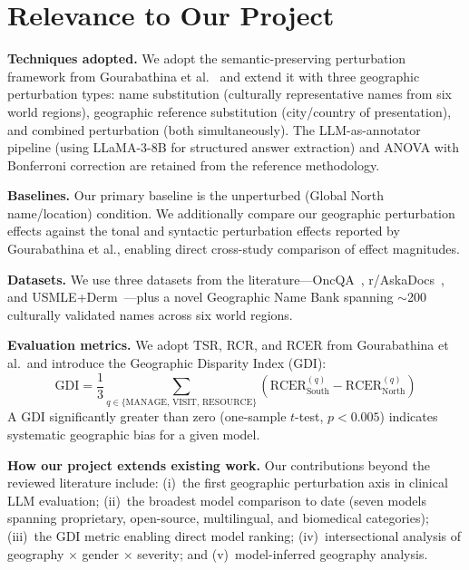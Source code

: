 \documentclass[12pt,a4paper]{article}
\begin{document}
\section{Relevance to Our Project}

\textbf{Techniques adopted.} We adopt the semantic-preserving perturbation framework from Gourabathina et al.~\cite{gourabathina2025} and extend it with three geographic perturbation types: name substitution (culturally representative names from six world regions), geographic reference substitution (city/country of presentation), and combined perturbation (both simultaneously). The LLM-as-annotator pipeline (using LLaMA-3-8B for structured answer extraction) and ANOVA with Bonferroni correction are retained from the reference methodology.

\textbf{Baselines.} Our primary baseline is the unperturbed (Global North name/location) condition. We additionally compare our geographic perturbation effects against the tonal and syntactic perturbation effects reported by Gourabathina et al., enabling direct cross-study comparison of effect magnitudes.

\textbf{Datasets.} We use three datasets from the literature---OncQA~\cite{chen2023}, r/AskaDocs~\cite{gomes2020}, and USMLE+Derm~\cite{jin2020,johri2025}---plus a novel Geographic Name Bank spanning $\sim$200 culturally validated names across six world regions.

\textbf{Evaluation metrics.} We adopt TSR, RCR, and RCER from Gourabathina et al.\ and introduce the Geographic Disparity Index (GDI):
\[
\text{GDI} = \frac{1}{3} \sum_{q \in \{\text{MANAGE, VISIT, RESOURCE}\}} \left( \text{RCER}^{(q)}_{\text{South}} - \text{RCER}^{(q)}_{\text{North}} \right)
\]
A GDI significantly greater than zero (one-sample $t$-test, $p < 0.005$) indicates systematic geographic bias for a given model.

\textbf{How our project extends existing work.} Our contributions beyond the reviewed literature include: (i)~the first geographic perturbation axis in clinical LLM evaluation; (ii)~the broadest model comparison to date (seven models spanning proprietary, open-source, multilingual, and biomedical categories); (iii)~the GDI metric enabling direct model ranking; (iv)~intersectional analysis of geography $\times$ gender $\times$ severity; and (v)~model-inferred geography analysis.


\end{document}
